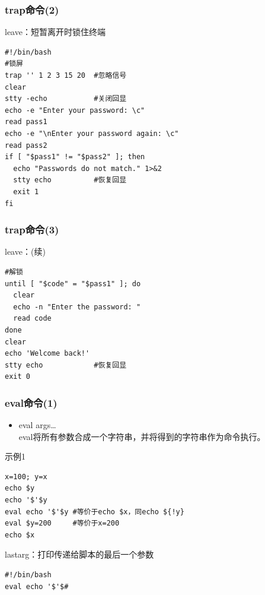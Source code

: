 \documentclass[xcolor=svgnames,presentation]{beamer}
\begin{document}
\begin{frame}[fragile]
\frametitle{trap命令(2)}
\label{sec-1-3-9}
\begin{exampleblock}{leave：短暂离开时锁住终端}
\label{sec-1-3-9-1}


\begin{verbatim}
#!/bin/bash
#锁屏
trap '' 1 2 3 15 20  #忽略信号
clear
stty -echo           #关闭回显
echo -e "Enter your password: \c"
read pass1
echo -e "\nEnter your password again: \c"
read pass2
if [ "$pass1" != "$pass2" ]; then
  echo "Passwords do not match." 1>&2
  stty echo          #恢复回显
  exit 1
fi
\end{verbatim}
\end{exampleblock}
\end{frame}
\begin{frame}[fragile]
\frametitle{trap命令(3)}
\label{sec-1-3-10}
\begin{exampleblock}{leave：(续)}
\label{sec-1-3-10-1}


\begin{verbatim}
#解锁
until [ "$code" = "$pass1" ]; do
  clear
  echo -n "Enter the password: "
  read code
done
clear
echo 'Welcome back!'
stty echo            #恢复回显
exit 0
\end{verbatim}
\end{exampleblock}
\end{frame}
\begin{frame}[fragile]
\frametitle{eval命令(1)}
\label{sec-1-3-11}
\begin{itemize}

\item eval args\ldots{}\\
\label{sec-1-3-11-1}%
eval将所有参数合成一个字符串，并将得到的字符串作为命令执行。
\end{itemize} %
\begin{exampleblock}{示例1}
\label{sec-1-3-11-2}


\begin{verbatim}
x=100; y=x
echo $y
echo '$'$y
eval echo '$'$y #等价于echo $x，同echo ${!y}
eval $y=200     #等价于x=200
echo $x
\end{verbatim}
\end{exampleblock}
\begin{block}{lastarg：打印传递给脚本的最后一个参数}
\label{sec-1-3-11-3}


\begin{verbatim}
#!/bin/bash
eval echo '$'$#
\end{verbatim}
\end{block}
\end{frame}
\end{document}
